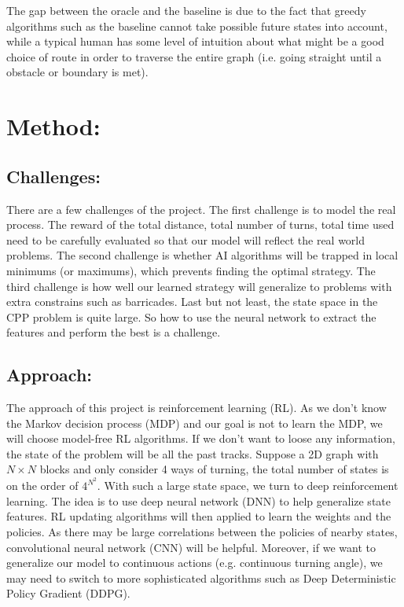 \documentclass{article}
\begin{document}
\begin{normalsize}
		        The gap between the oracle and the baseline is due to the fact that greedy algorithms such as the baseline cannot take possible future states into account, while a typical human has some level of intuition about what might be a good choice of route in order to traverse the entire graph (i.e. going straight until a obstacle or boundary is met).
            
        \section{Method:}
            
            \subsection{Challenges:}
            
                There are a few challenges of the project. The first challenge is to model the real process. The reward of the total distance, total number of turns, total time used need to be carefully evaluated so that our model will reflect the real world problems. The second challenge is whether AI algorithms will be trapped in local minimums (or maximums), which prevents finding the optimal strategy. The third challenge is how well our learned strategy will generalize to problems with extra constrains such as barricades. Last but not least, the state space in the CPP problem is quite large. So how to use the neural network to extract the features and perform the best is a challenge.
                
            \subsection{Approach:}
            
                The approach of this project is reinforcement learning (RL). As we don't know the Markov decision process (MDP) and our goal is not to learn the MDP, we will choose model-free RL algorithms. If we don't want to loose any information, the state of the problem will be all the past tracks. Suppose a 2D graph with $N \times N$ blocks and only consider 4 ways of turning, the total number of states is on the order of $4^{N^2}$. With such a large state space, we turn to deep reinforcement learning. The idea is to use deep neural network (DNN) to help generalize state features. RL updating algorithms will then applied to learn the weights and the policies. As there may be large correlations between the policies of nearby states, convolutional neural network (CNN) will be helpful. Moreover, if we want to generalize our model to continuous actions (e.g. continuous turning angle), we may need to switch to more sophisticated algorithms such as Deep Deterministic Policy Gradient (DDPG).
            

\end{normalsize}
\end{document}
